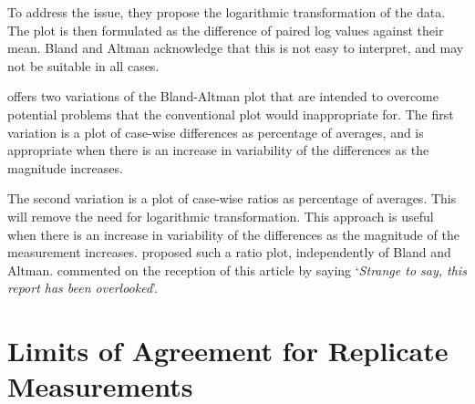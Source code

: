 \documentclass[12pt, a4paper]{report}
\theoremstyle{plain}
\theoremstyle{definition}
\theoremstyle{remark}
\begin{document}
To address the issue, they propose the logarithmic transformation of the data. The plot is then formulated as the difference of paired log values against their mean. Bland and Altman acknowledge that this is not easy to interpret, and may not be suitable in all cases.

\citet{BA99} offers two variations of the Bland-Altman plot that are intended to overcome potential problems that the conventional
plot would inappropriate for. The first variation is a plot of case-wise differences as percentage of averages, and is
appropriate when there is an increase in variability of the differences as the magnitude increases. 

The second variation is a
plot of case-wise ratios as percentage of averages. This will remove the need for logarithmic transformation. This approach is useful
when there is an increase in variability of the differences as the magnitude of the measurement increases. \citet{Eksborg} proposed
such a ratio plot, independently of Bland and Altman. \citet{Dewitte} commented on the reception of this article by saying `\textit{Strange to say, this report has been overlooked}'.
	
	
\section{Limits of Agreement for Replicate Measurements}
\end{document}
